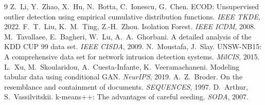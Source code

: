 \documentclass[10pt,a4paper]{article}
\begin{document}
\begin{thebibliography}{9}\small
{} Z.~Li, Y.~Zhao, X.~Hu, N.~Botta, C.~Ionescu, G.~Chen. ECOD: Unsupervised outlier detection using empirical cumulative distribution functions. \emph{IEEE TKDE}, 2022.
 F.~T.~Liu, K.~M.~Ting, Z.-H.~Zhou. Isolation Forest. \emph{IEEE ICDM}, 2008.
 M.~Tavallaee, E.~Bagheri, W.~Lu, A.~A.~Ghorbani. A detailed analysis of the KDD CUP 99 data set. \emph{IEEE CISDA}, 2009.
 N.~Moustafa, J.~Slay. UNSW-NB15: A comprehensive data set for network intrusion detection systems. \emph{MilCIS}, 2015.
 L.~Xu, M.~Skoularidou, A.~Cuesta-Infante, K.~Veeramachaneni. Modeling tabular data using conditional GAN. \emph{NeurIPS}, 2019.
 A.~Z.~Broder. On the resemblance and containment of documents. \emph{SEQUENCES}, 1997.
 D.~Arthur, S.~Vassilvitskii. k-means++: The advantages of careful seeding. \emph{SODA}, 2007.
\end{thebibliography}
\end{document}

